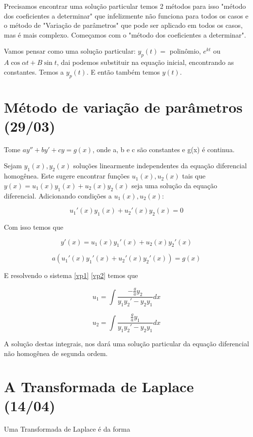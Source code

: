 \documentclass[12pt]{article}
\begin{document}
Precisamos encontrar uma solução particular temos 2 métodos para isso "método dos coeficientes a determinar" que infelizmente não funciona para todos os casos e o método de "Variação de parâmetros" que pode ser aplicado em todos os casos, mas é mais complexo. Começamos com o "método dos coeficientes a determinar".

Vamos pensar como uma solução particular: $y_p(t) = $ polinômio, $e^{k t}$ ou $A \cos \alpha t + B \sin t$, dai podemos substituir na equação inicial, encontrando as constantes. Temos a $y_p(t)$. E então também temos $y(t)$.

\section{Método de variação de parâmetros (29/03)}

Tome $a y'' + b y' + c y = g(x)$, onde a, b e c são constantes e g(x) é continua.

Sejam $y_1(x), y_2(x)$ soluções linearmente independentes da equação diferencial homogênea. Este sugere encontrar funções $u_1(x), u_2(x)$ tais que $y(x) = u_1(x) y_1(x) + u_2(x) y_2(x)$ seja uma solução da equação diferencial. Adicionando condições a $u_1(x), u_2(x)$:

\begin{equation}\label{vp1}
    u_1'(x) y_1(x) + u_2'(x) y_2(x) = 0
\end{equation}

Com isso temos que 

$$y'(x) = u_1(x) y_1'(x) + u_2(x) y_2'(x)$$

\begin{equation}\label{vp2}
    a(u_1'(x) y_1'(x) + u_2'(x) y_2'(x)) = g(x)
\end{equation}

E resolvendo o sistema \ref{vp1} \ref{vp2} temos que

$$u_1 = \int \dfrac{- \frac{g}{a} y_2}{y_1 y_2' - y_2 y_1} d x$$

$$u_2 = \int \dfrac{\frac{g}{a} y_1}{y_1 y_2' - y_2 y_1} d x$$

A solução destas integrais, nos dará uma solução particular da equação diferencial não homogênea de segunda ordem.

\section{A Transformada de Laplace (14/04)}
Uma Transformada de Laplace é da forma
\end{document}
